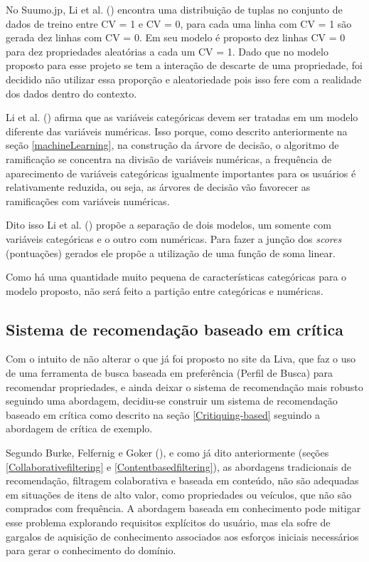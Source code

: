 No Suumo.jp, Li et al. (\citeyear{Summo:2017}) encontra uma distribuição de tuplas no conjunto de dados de treino entre CV = 1 e CV = 0, para cada uma linha com CV = 1 são gerada dez linhas com CV = 0. Em seu modelo é proposto dez linhas CV = 0 para dez propriedades aleatórias a cada um CV = 1. Dado que no modelo proposto para esse projeto se tem a interação de descarte de uma propriedade, foi decidido não utilizar essa proporção e aleatoriedade pois isso fere com a realidade dos dados dentro do contexto.

Li et al. (\citeyear{Summo:2017}) afirma que as variáveis categóricas devem ser tratadas em um modelo diferente das variáveis numéricas. Isso porque, como descrito anteriormente na seção \ref{machineLearning}, na construção da árvore de decisão, o algoritmo de ramificação se concentra na divisão de variáveis numéricas, a frequência de aparecimento de variáveis categóricas igualmente importantes para os usuários é relativamente reduzida, ou seja, as árvores de decisão vão favorecer as ramificações com variáveis numéricas.

Dito isso Li et al. (\citeyear{Summo:2017}) propõe a separação de dois modelos, um somente com variáveis categóricas e o outro com numéricas. Para fazer a junção dos \textit{scores} (pontuações) gerados ele propõe a utilização de uma função de soma linear.

Como há uma quantidade muito pequena de características categóricas para o modelo proposto, não será feito a partição entre categóricas e numéricas.

\subsection{Sistema de recomendação baseado em crítica}

Com o intuito de não alterar o que já foi proposto no site da Liva, que faz o uso de uma ferramenta de busca baseada em preferência (Perfil de Busca) para recomendar propriedades, e ainda deixar o sistema de recomendação mais robusto seguindo uma abordagem, decidiu-se construir um sistema de recomendação baseado em crítica como descrito na seção \ref{Critiquing-based} seguindo a abordagem de crítica de exemplo.
	
Segundo Burke, Felfernig e Goker (\citeyear{Burke}), e como já dito anteriormente (seções \ref{Collaborativefiltering} e \ref{Contentbasedfiltering}), as abordagens tradicionais de recomendação, filtragem colaborativa e baseada em conteúdo, não são adequadas em situações de itens de alto valor, como propriedades ou veículos, que não são comprados com frequência. A abordagem baseada em conhecimento pode mitigar esse problema explorando requisitos explícitos do usuário, mas ela sofre de gargalos de aquisição de conhecimento associados aos esforços iniciais necessários para gerar o conhecimento do domínio.

